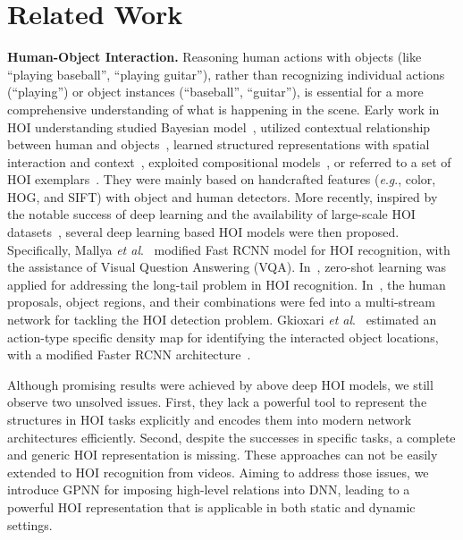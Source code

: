 \documentclass[runningheads]{llncs}
\newcommand{\etal}{\textit{et al}.}
\newcommand{\eg}{\textit{e}.\textit{g}.}
\begin{document}
\section{Related Work}
\label{sec:related_work}
\noindent\textbf{Human-Object Interaction.} Reasoning human actions with objects (like ``playing baseball'', ``playing guitar''), rather than recognizing individual actions (``playing'') or object instances (``baseball'', ``guitar''), is essential for a more comprehensive understanding of what is happening in the scene. Early work in HOI understanding studied Bayesian model~\cite{gupta2007objects,gupta2009observing}, utilized contextual relationship between human and objects~\cite{yao2010grouplet,yao2010modeling,yao2011human}, learned structured representations with spatial interaction and context~\cite{delaitre2011learning}, exploited compositional models~\cite{desai2012detecting}, or referred to a set of HOI exemplars~\cite{hu2013recognising}. They were mainly based on handcrafted features (\eg, color, HOG, and SIFT) with object and human detectors. More recently, inspired by the notable success of deep learning and the availability of large-scale HOI datasets~\cite{chao2015hico,chao2017learning}, several deep learning based HOI models were then proposed. Specifically, Mallya \etal~\cite{mallya2016learning} modified Fast RCNN model \cite{girshick2015fast} for HOI recognition, with the assistance of Visual Question Answering (VQA). In~\cite{shenscaling}, zero-shot learning was applied for addressing the long-tail problem in HOI recognition. In~\cite{chao2017learning}, the human proposals, object regions, and their combinations were fed into a multi-stream network for tackling the HOI detection problem. Gkioxari \etal~\cite{gkioxari2017detecting} estimated an action-type specific density map for identifying the interacted object locations, with a modified Faster RCNN architecture~\cite{ren2015faster}.

Although promising results were achieved by above deep HOI models, we still observe two unsolved issues. First, they lack a powerful tool to represent the structures in HOI tasks explicitly and encodes them into modern network architectures efficiently. Second, despite the successes in specific tasks, a complete and generic HOI representation is missing. These approaches can not be easily extended to HOI recognition from videos. Aiming to address those issues, we introduce GPNN for imposing high-level relations into DNN, leading to a powerful HOI representation that is applicable in both static and dynamic settings.
\end{document}
